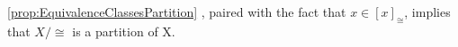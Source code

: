 \begin{rmk}
    \label{rmk:quotientsetpartition}
    \ref{prop:EquivalenceClassesPartition}
	, paired with the fact that 
	$x \in [x]_{\cong}$, 
	implies that 
	$X/\cong$ is a partition of X. 
\end{rmk}